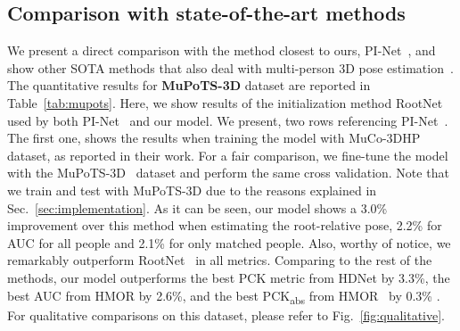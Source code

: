\subsection{Comparison with state-of-the-art methods}


We present a direct comparison with the method closest to ours, PI-Net~\cite{guo2021pi}, and show other SOTA methods that also deal with multi-person 3D pose estimation~\cite{HMOR2020,hdnet_2020,smap_eccv2020,zanfir_multipeople_nips18}.
The quantitative results for \textbf{MuPoTS-3D} dataset are reported in Table~\ref{tab:mupots}. Here, we show results of the initialization method RootNet~\cite{Moon_2019_ICCV_3DMPPE} used by both PI-Net~\cite{guo2021pi} and our model. We present, two rows referencing PI-Net~\cite{guo2021pi}. The first one, shows the results when training the model with MuCo-3DHP~\cite{singleshot} dataset, as reported in their work. For a fair comparison, we fine-tune the model with the MuPoTS-3D~\cite{singleshot} dataset and perform the same cross validation. Note that we train and test with MuPoTS-3D due to the reasons explained in Sec.~\ref{sec:implementation}. As it can be seen, our model shows a 3.0\% improvement over this method when estimating the root-relative pose, 2.2\% for AUC for all people and 2.1\% for only matched people. Also, worthy of notice, we remarkably outperform RootNet~\cite{Moon_2019_ICCV_3DMPPE} in all metrics. Comparing to the rest of the methods, our model outperforms the best PCK metric from HDNet by 3.3\%, the best AUC from HMOR by 2.6\%, and the best PCK\textsubscript{abs} from HMOR~\cite{HMOR2020} by 0.3\% . For qualitative comparisons on this dataset, please refer to Fig.~\ref{fig:qualitative}.




